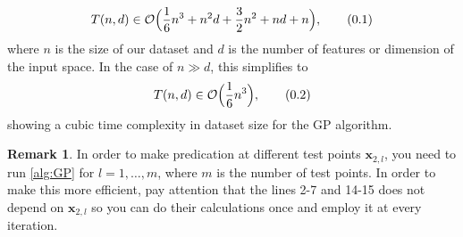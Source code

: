 \documentclass[10pt]{article}
\theoremstyle{definition}
\newtheorem*{rem}{Remark}
\newcommand\eqnum{\addtocounter{equation}{1}\tag{\arabic{section}.\arabic{equation}}}
\begin{document}
\begin{equation*}
T(n,d) \in \mathcal{O}\Big(\frac{1}{6}n^3+n^2d+\frac{3}{2}n^2+nd+n\Big),
\eqnum
\end{equation*}
where $n$ is the size of our dataset and $d$ is the number of features or dimension of the input space. In the case of $n \gg d$, this simplifies to
\begin{equation*}
T(n,d) \in \mathcal{O}\Big(\frac{1}{6}n^3\Big),
\eqnum
\end{equation*}
showing a cubic time complexity in dataset size for the GP algorithm.
\begin{rem}
In order to make predication at different test points $\mathbf{x}_{2, l}$, you need to run \cref{alg:GP} for $l=1,\dots,m$, where $m$ is the number of test points. In order to make this more efficient, pay attention that the lines 2-7 and 14-15 does not depend on $\mathbf{x}_{2, l}$ so you can do their calculations once and employ it at every iteration.
\end{rem}
\end{document}

